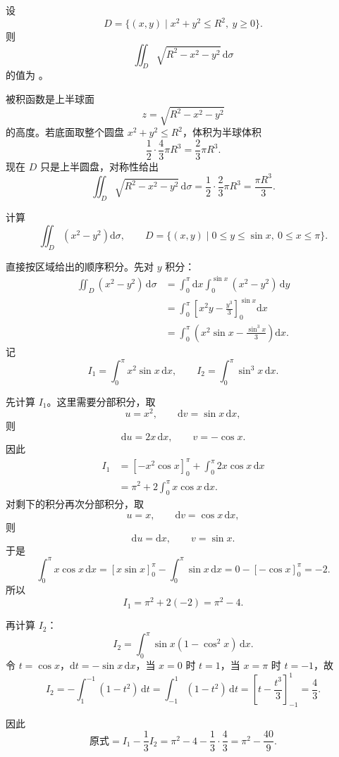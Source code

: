 \documentclass[answer,fontset=fandol]{THUExam}
\begin{document}
\begin{problem}
设
\[
D=\{(x,y)\mid x^2+y^2\leqslant R^2,\ y\geqslant0\}.
\]
则
\[
\iint_D\sqrt{R^2-x^2-y^2}\,\mathrm{d}\sigma
\]
的值为 。
\end{problem}
\begin{solution}
被积函数是上半球面
\[
z=\sqrt{R^2-x^2-y^2}
\]
的高度。若底面取整个圆盘 $x^2+y^2\leqslant R^2$，体积为半球体积
\[
\frac12\cdot\frac{4}{3}\pi R^3=\frac{2}{3}\pi R^3.
\]
现在 $D$ 只是上半圆盘，对称性给出
\[
\iint_D\sqrt{R^2-x^2-y^2}\,\mathrm{d}\sigma
=\frac12\cdot\frac{2}{3}\pi R^3
=\boxed{\frac{\pi R^3}{3}}.
\]
\end{solution}
\bigskip

\newpage
{}

\begin{problem}
计算
\[
\iint_D\left(x^2-y^2\right)\mathrm{d}\sigma,\qquad
D=\{(x,y)\mid 0\leqslant y\leqslant \sin x,\ 0\leqslant x\leqslant \pi\}.
\]
\end{problem}
\begin{solution}
直接按区域给出的顺序积分。先对 $y$ 积分：
\begin{align*}
\iint_D(x^2-y^2)\,\mathrm{d}\sigma
&=\int_0^\pi\mathrm{d}x\int_0^{\sin x}(x^2-y^2)\,\mathrm{d}y\\
&=\int_0^\pi\left[x^2y-\frac{y^3}{3}\right]_{0}^{\sin x}\mathrm{d}x\\
&=\int_0^\pi\left(x^2\sin x-\frac{\sin^3x}{3}\right)\mathrm{d}x.
\end{align*}
记
\[
I_1=\int_0^\pi x^2\sin x\,\mathrm{d}x,\qquad
I_2=\int_0^\pi\sin^3x\,\mathrm{d}x.
\]

先计算 $I_1$。这里需要分部积分，取
\[
u=x^2,\qquad \mathrm{d}v=\sin x\,\mathrm{d}x,
\]
则
\[
\mathrm{d}u=2x\,\mathrm{d}x,\qquad v=-\cos x.
\]
因此
\begin{align*}
I_1
&=\left[-x^2\cos x\right]_0^\pi+\int_0^\pi 2x\cos x\,\mathrm{d}x\\
&=\pi^2+2\int_0^\pi x\cos x\,\mathrm{d}x.
\end{align*}
对剩下的积分再次分部积分，取
\[
u=x,\qquad \mathrm{d}v=\cos x\,\mathrm{d}x,
\]
则
\[
\mathrm{d}u=\mathrm{d}x,\qquad v=\sin x.
\]
于是
\[
\int_0^\pi x\cos x\,\mathrm{d}x
=\left[x\sin x\right]_0^\pi-\int_0^\pi\sin x\,\mathrm{d}x
=0-\left[-\cos x\right]_0^\pi=-2.
\]
所以
\[
I_1=\pi^2+2(-2)=\pi^2-4.
\]

再计算 $I_2$：
\[
I_2=\int_0^\pi\sin x(1-\cos^2x)\,\mathrm{d}x.
\]
令 $t=\cos x$，$\mathrm{d}t=-\sin x\,\mathrm{d}x$，当 $x=0$ 时 $t=1$，当 $x=\pi$ 时 $t=-1$，故
\[
I_2=-\int_1^{-1}(1-t^2)\,\mathrm{d}t
=\int_{-1}^{1}(1-t^2)\,\mathrm{d}t
=\left[t-\frac{t^3}{3}\right]_{-1}^{1}
=\frac{4}{3}.
\]

因此
\[
\text{原式}=I_1-\frac{1}{3}I_2
=\pi^2-4-\frac{1}{3}\cdot\frac{4}{3}
=\boxed{\pi^2-\frac{40}{9}}.
\]
\end{solution}
\bigskip
\end{document}
